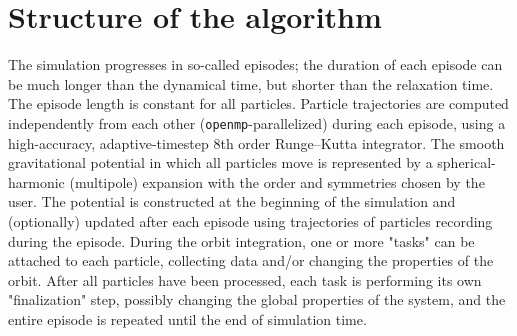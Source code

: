 \documentclass[12pt]{article}
\begin{document}
\section{Structure of the algorithm}  \label{sec:algorithm}

The simulation progresses in so-called episodes; the duration of each episode can be much longer than the dynamical time, but shorter than the relaxation time. The episode length is constant for all particles. %
Particle trajectories are computed independently from each other (\texttt{openmp}-parallelized) during each episode, using a high-accuracy, adaptive-timestep 8th order Runge--Kutta integrator.
The smooth gravitational potential in which all particles move is represented by a spherical-harmonic (multipole) expansion with the order and symmetries chosen by the user.
The potential is constructed at the beginning of the simulation and (optionally) updated after each episode using trajectories of particles recording during the episode. 
During the orbit integration, one or more "tasks" can be attached to each particle, collecting data and/or changing the properties of the orbit. After all particles have been processed, each task is performing its own "finalization" step, possibly changing the global properties of the system, and the entire episode is repeated until the end of simulation time.
\end{document}
